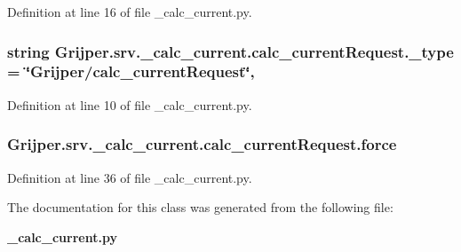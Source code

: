 Definition at line 16 of file \-\_\-calc\-\_\-current.\-py.

\subsubsection[{\-\_\-type}]{\setlength{\rightskip}{0pt plus 5cm}string Grijper.\-srv.\-\_\-calc\-\_\-current.\-calc\-\_\-current\-Request.\-\_\-type = \char`\"{}Grijper/{\bf calc\-\_\-current\-Request}\char`\"{}\hspace{0.3cm}{\ttfamily [static]}, {\ttfamily [private]}}\label{classGrijper_1_1srv_1_1__calc__current_1_1calc__currentRequest_aa3de6df919e4c08372edda82aace1378}


Definition at line 10 of file \-\_\-calc\-\_\-current.\-py.

\subsubsection[{force}]{\setlength{\rightskip}{0pt plus 5cm}Grijper.\-srv.\-\_\-calc\-\_\-current.\-calc\-\_\-current\-Request.\-force}\label{classGrijper_1_1srv_1_1__calc__current_1_1calc__currentRequest_a29e1be4a31385b3c0b9981747feb46c5}


Definition at line 36 of file \-\_\-calc\-\_\-current.\-py.



The documentation for this class was generated from the following file\-:\begin{DoxyCompactItemize}
\item 
{\bf \-\_\-calc\-\_\-current.\-py}\end{DoxyCompactItemize}

